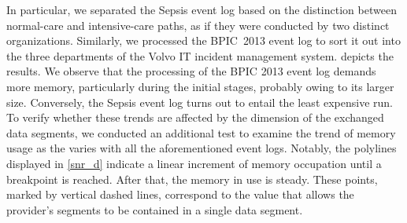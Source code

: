 In particular, we separated the Sepsis event log based on the distinction between normal-care and intensive-care paths, as if they were conducted by two distinct organizations. Similarly, we processed the BPIC~2013 event log to sort it out into the three departments of the Volvo IT incident management system. %
 depicts the results. We observe that the processing of the BPIC 2013 event log demands more memory, particularly during the initial stages, probably owing to its larger size. Conversely, the Sepsis event log turns out to entail the least expensive run. %
To verify whether these trends are affected by the dimension of the exchanged data segments, we conducted an additional test to examine the trend of memory usage as the {\SegSize} varies with all the aforementioned event logs. %
Notably, the polylines displayed in \cref{snr_d} indicate a linear increment of memory occupation until a breakpoint is reached. After that, the memory in use is steady. These points, marked by vertical dashed lines, correspond %
to the {\SegSize} value that allows the provider's segments to be contained in a single data segment.

